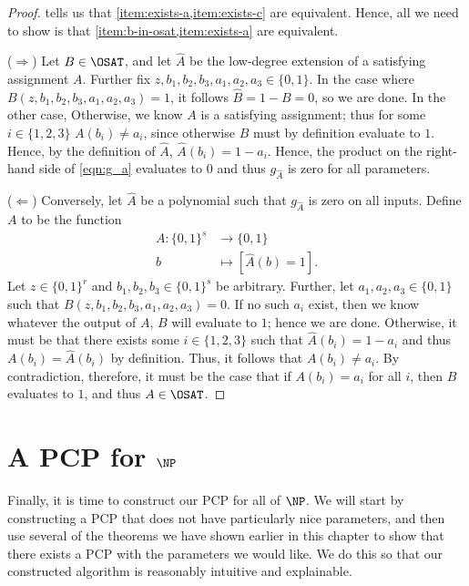 \documentclass[english,12pt]{reedthesis}
\theoremstyle{plain}
\theoremstyle{definition}
\theoremstyle{remark}
\begin{document}
\begin{proof}
   tells us that \cref{item:exists-a,item:exists-c} are
  equivalent. Hence, all we need to show is that
  \cref{item:b-in-osat,item:exists-a} are equivalent.

  ($\Rightarrow$) Let $B \in \OSAT$, and let $\hat{A}$ be the low-degree extension of a satisfying
  assignment $A$. Further fix
  $z, b_{1}, b_{2}, b_{3}, a_{1}, a_{2}, a_{3} \in \{0, 1\}$. In the case where
  $B(z, b_{1}, b_{2}, b_{3}, a_{1}, a_{2}, a_{3}) = 1$, it follows
  $\hat{B} = 1 - B = 0$, so we are done. In the other case, Otherwise, we know
  $A$ is a satisfying assignment; thus for some $i \in \{1, 2, 3\}$
  $A(b_{i}) \ne a_{i}$, since otherwise $B$ must by definition evaluate to $1$.
  Hence, by the definition of $\hat{A}$, $\hat{A}(b_{i}) = 1 - a_{i}$. Hence,
  the product on the right-hand side of \cref{eqn:g_a} evaluates to $0$ and thus
  $g_{\hat{A}}$ is zero for all parameters.

  ($\Leftarrow$) Conversely, let $\hat{A}$ be a polynomial such that $g_{\hat{A}}$ is
  zero on all inputs. Define $A$ to be the function
  \begin{align*}
    A: \{0, 1\}^{s}  &\rightarrow \{0, 1\} \\
    b &\mapsto [\hat{A}(b) = 1].
  \end{align*}
  Let $z \in \{0, 1\}^{r}$ and $b_{1}, b_{2}, b_{3} \in \{0, 1\}^{s}$ be arbitrary.
  Further, let $a_{1}, a_{2}, a_{3} \in \{0, 1\}$ such that
  $B(z, b_{1}, b_{2}, b_{3}, a_{1}, a_{2}, a_{3}) = 0$. If no such $a_{i}$
  exist, then we know whatever the output of $A$, $B$ will evaluate to $1$;
  hence we are done. Otherwise, it must be that there exists some
  $i \in \{1, 2, 3\}$ such that $\hat{A}(b_{i}) = 1 - a_{i}$ and thus
  $A(b_{i}) = \hat{A}(b_{i})$ by definition. Thus, it follows that
  $A(b_{i}) \ne a_{i}$. By contradiction, therefore, it must be the case that if
  $A(b_{i}) = a_{i}$ for all $i$, then $B$ evaluates to $1$, and thus $A \in \OSAT$.
\end{proof}

\section{A PCP for $\NP$}

Finally, it is time to construct our PCP for all of $\NP$. We will start by
constructing a PCP that does not have particularly nice parameters, and then use
several of the theorems we have shown earlier in this chapter to show that there
exists a PCP with the parameters we would like. We do this so that our
constructed algorithm is reasonably intuitive and explainable.
\end{document}

